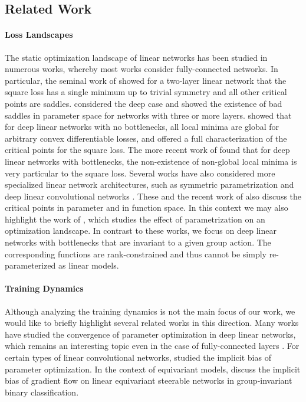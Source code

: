 \documentclass{article}
\theoremstyle{plain}
\theoremstyle{definition}
\theoremstyle{remark}
\theoremstyle{remark}
\begin{document}
\subsection{Related Work}
\paragraph{Loss Landscapes}
The static optimization landscape of linear networks has been studied in numerous works, whereby most works consider fully-connected networks. 
In particular, the seminal work of \citet{Baldi1989Neural} showed for a two-layer linear network that the square loss has a single minimum up to trivial symmetry and all other critical points are saddles. 
\citet{Kawaguchi2016Deep} considered the deep case and showed the existence of bad saddles in parameter space for networks with three or more layers. 
\citet{Laurent2018Deep} showed that for deep linear networks with no bottlenecks, all local minima are global for arbitrary convex differentiable losses, and \citet{zhou2018critical} offered a full characterization of the critical points for the square loss. 
The more recent work of \citet{Trager2020Pure} found that for deep linear networks with bottlenecks, the non-existence of non-global local minima is very particular to the square loss.
Several works have also considered more specialized linear network architectures, such as symmetric parametrization \citep{Tarmoun2021Understanding} and deep linear convolutional networks \citep{kohn2022geometry,kohn2023function}. 
These and the recent work of \cite{shahverdi2024algebraic} also discuss the critical points in parameter and in function space. 
In this context we may also highlight the work of \citet{levin_2024}, which studies the effect of parametrization on an optimization landscape.
In contrast to these works, we focus on deep linear networks with bottlenecks that are invariant to a given group action. The corresponding functions are rank-constrained and thus cannot be simply re-parameterized as linear models.

\paragraph{Training Dynamics} 
Although analyzing the training dynamics is not the main focus of our work, we would like to briefly highlight several related works in this direction. 
Many works have studied the convergence of parameter optimization in deep linear networks, which remains an interesting topic even in the case of fully-connected layers \citep{Arora2018Optimization, Arora2019Convergence, Arora2019Implicit, xu2023linear, Bah2021Learning, pmlr-v202-brechet23a, saxe2014}. 
For certain types of linear convolutional networks, \citet{gunasekar2018implicit} studied the implicit bias of parameter optimization. 
In the context of equivariant models, \cite{chen2023implicit} discuss the implicit bias of gradient flow on linear equivariant steerable networks in group-invariant binary classification.
\end{document}

